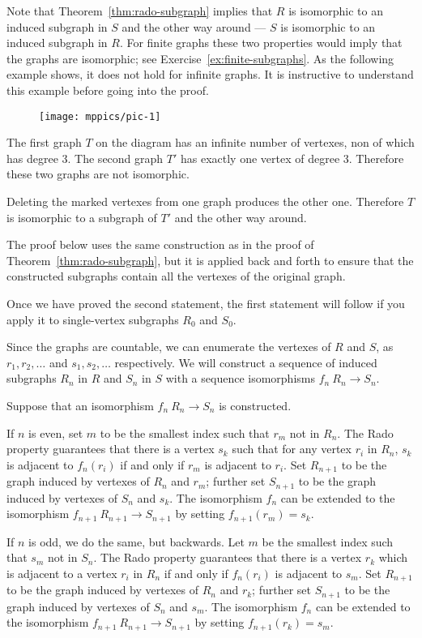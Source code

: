 Note that Theorem~\ref{thm:rado-subgraph} implies that $R$ is isomorphic to an induced subgraph in $S$ and the other way around --- $S$ is isomorphic to an induced subgraph in $R$.
For finite graphs these two properties would imply that the graphs are isomorphic; see Exercise~\ref{ex:finite-subgraphs}.
As the following example shows, it does not hold for infinite graphs.
It is instructive to understand this example before going into the proof.

\begin{figure}[h!]%
\vskip-0mm
\centering
\texttt{[image: mppics/pic-1]}
\vskip-0mm
\end{figure}
 
The first graph $T$ on the diagram has an infinite number of vertexes, non of which has degree 3.
The second graph $T'$ has exactly one vertex of degree 3. 
Therefore these two graphs are not isomorphic.

Deleting the marked vertexes from one graph produces the other one. 
Therefore $T$ is isomorphic to a subgraph of $T'$ and the other way around.

The proof below uses the same construction as in the proof of Theorem~\ref{thm:rado-subgraph}, but it is applied back and forth to ensure that the constructed subgraphs contain all the vertexes of the original graph.


Once we have proved the second statement,
the first statement will follow if you apply it to single-vertex subgraphs $R_0$ and $S_0$.

Since the graphs are countable,
we can enumerate the vertexes of $R$ and $S$, as $r_1 , r_2 , \dots$ and $s_1, s_2,\dots$ respectively. 
We will construct a sequence of induced subgraphs $R_n$ in $R$ and $S_n$ in $S$ with a sequence isomorphisms $f_n\:R_n\to S_n$.

Suppose that an isomorphism $f_n\:R_n\to S_n$ is constructed. 

If $n$ is even, set $m$ to be the smallest index such that $r_m$ not in $R_n$.
The Rado property guarantees that there is a vertex $s_k$ such that for any vertex $r_i$ in $R_n$, $s_k$ is adjacent to $f_n(r_i)$ if and only if $r_m$ is adjacent to $r_i$.
Set $R_{n+1}$ to be the graph induced by vertexes of $R_n$ and $r_m$;
further set $S_{n+1}$ to be the graph induced by vertexes of $S_n$ and $s_k$.
The isomorphism $f_n$ can be extended to the isomorphism $f_{n+1}\:R_{n+1}\to S_{n+1}$ by
setting $f_{n+1}(r_m)=s_k$.  

If $n$ is odd, we do the same, but backwards.
Let $m$ be the smallest index such that $s_m$ not in $S_n$.
The Rado property guarantees that there is a vertex $r_k$ which is adjacent to a vertex $r_i$ in $R_n$ if and only if $f_n(r_i)$ is adjacent to $s_m$.
Set $R_{n+1}$ to be the graph induced by vertexes of $R_n$ and $r_k$;
further set $S_{n+1}$ to be the graph induced by vertexes of $S_n$ and $s_m$.
The isomorphism $f_n$ can be extended to the isomorphism $f_{n+1}\:R_{n+1}\to S_{n+1}$ by
setting $f_{n+1}(r_k)=s_m$.

